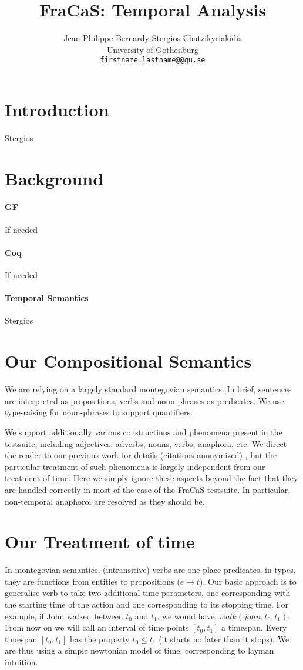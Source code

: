 \documentclass[a4paper,11pt]{article}
\title{FraCaS: Temporal Analysis}
\author{Jean-Philippe Bernardy \qquad Stergios Chatzikyriakidis \\
  University of Gothenburg\\
  {\tt firstname.lastname@@gu.se} \\}
\date{}
\begin{document}
\maketitle

\section{Introduction}
Stergios
\section{Background}
\paragraph{GF}
If needed
\paragraph{Coq}
If needed
\paragraph{Temporal Semantics}
Stergios
 
\section{Our Compositional Semantics}

We are relying on a largely standard montegovian semantics. In brief,
sentences are interpreted as propositions, verbs and noun-phrases as
predicates.  We use type-raising for noun-phrases to support
quantifiers.

We support additionally various constructinos and phenomena present in
the testsuite, including adjectives, adverbs, nouns, verbs, anaphora,
etc. We direct the reader to our previous work for details \ifanon
(citations anonymized) \else \citet{} \fi, but the particular
treatment of such phenomena is largely independent from our treatment
of time.
%
Here we simply ignore these aspects beyond the fact that they
are handled correctly in most of the case of the FraCaS testsuite.  In
particular, non-temporal anaphoroi are resolved as they should be.

\section{Our Treatment of time}

In montegovian semantics, (intransitive) verbs are one-place
predicates; in types, they are functions from entities to propositions
($e \to t$).  Our basic approach is to generalise verb to take two
additional time parameters, one corresponding with the starting time
of the action and one corresponding to its stopping time. For example,
if John walked between $t_0$ and $t_1$, we would have:
$walk(john,t_0,t_1)$. From now on we will call an interval of time
points $[t_0,t_1]$ a timespan. Every timespan $[t_0,t_1]$ has the
property $t_0 ≤ t_1$ (it starts no later than it stops). We are thus
using a simple newtonian model of time, corresponding to layman
intuition.
\end{document}
